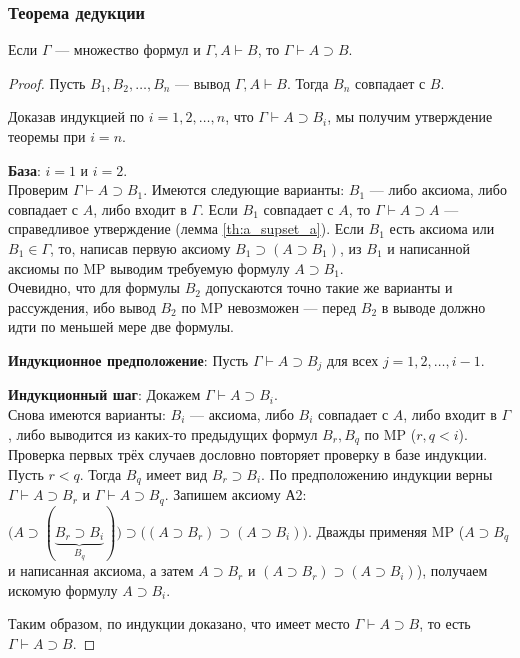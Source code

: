 \subsubsection{Теорема дедукции}
\nobreak\vspace{0.5em}
\nopagebreak
\begin{theorem}
    Если $\Gamma$ --- множество формул и $\Gamma, A \vdash B$, то $\Gamma \vdash A \supset B$.
\end{theorem}
\begin{proof}\leavevmode

    Пусть $B_1, B_2, \dots, B_n$ --- вывод $\Gamma, A \vdash B$. Тогда $B_n$ совпадает с $B$. 

    Доказав индукцией по $i = 1, 2, \dots, n$, что $\Gamma \vdash A \supset B_i$, мы получим утверждение теоремы при $i = n$.

    \textbf{База}: $i = 1$ и $i = 2$. \\
    Проверим $\Gamma \vdash A \supset B_1$. Имеются следующие варианты: $B_1$ --- либо аксиома, либо совпадает с $A$, либо входит в $\Gamma$. Если $B_1$ совпадает с $A$, то $\Gamma \vdash A \supset A$ --- справедливое утверждение (лемма \ref{th:a_supset_a}). Если $B_1$ есть аксиома или $B_1 \in \Gamma$, то, написав первую аксиому $B_1 \supset (A \supset B_1)$, из $B_1$ и написанной аксиомы по MP выводим требуемую формулу $A \supset B_1$. \\
    Очевидно, что для формулы $B_2$ допускаются точно такие же варианты и рассуждения, ибо вывод $B_2$ по MP невозможен --- перед $B_2$ в выводе должно идти по меньшей мере две формулы.

    \textbf{Индукционное предположение}: Пусть $\Gamma \vdash A \supset B_j$ для всех $j = 1, 2, \dots, i - 1$.
    
    \textbf{Индукционный шаг}: Докажем $\Gamma \vdash A \supset B_i$. \\
    Снова имеются варианты: $B_i$ --- аксиома, либо $B_i$ совпадает с $A$, либо входит в $\Gamma$, либо выводится из каких-то предыдущих формул $B_r, B_q$ по MP ($r, q < i$). Проверка первых трёх случаев дословно повторяет проверку в базе индукции. Пусть $r < q$. Тогда $B_q$ имеет вид $B_r \supset B_i$. По предположению индукции верны $\Gamma \vdash A \supset B_r$ и $\Gamma \vdash A \supset B_q$. Запишем аксиому А2: $\big(A \supset (\underbrace{B_r \supset B_i}_{B_q})\big) \supset \big((A \supset B_r) \supset (A \supset B_i)\big)$. Дважды применяя MP ($A \supset B_q$ и написанная аксиома, а затем $A \supset B_r$ и $(A \supset B_r) \supset (A \supset B_i)$), получаем искомую формулу $A \supset B_i$.

    Таким образом, по индукции доказано, что имеет место $\Gamma \vdash A \supset B$, то есть $\Gamma \vdash A \supset B$.
\end{proof}

